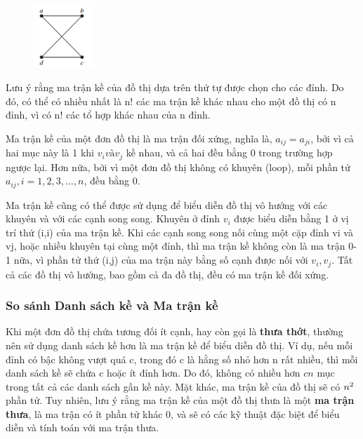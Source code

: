 \begin{figure}[H] %
    \centering %
    \includegraphics[width=0.2\textwidth]{assets/pic3.png} 
    \label{fig:gr_01}
\end{figure}


Lưu ý rằng ma trận kề của đồ thị dựa trên thứ tự được chọn cho các đỉnh. Do đó, có thể có nhiều nhất là n! các ma trận kề khác nhau cho một đồ thị có n đỉnh, vì có n! các tổ hợp khác nhau của n đỉnh.

Ma trận kề của một đơn đồ thị là ma trận đối xứng, nghĩa là, $a_{ij} = a_{ji}$, bởi vì cả hai mục này là 1 khi $v_i và v_j$ kề nhau, và cả hai đều bằng 0 trong trường hợp ngược lại. Hơn nữa, bởi vì một đơn đồ thị không có khuyên (loop), mỗi phần tử $a_{ij}, i = 1, 2, 3,…, n$, đều bằng 0.

Ma trận kề cũng có thể được sử dụng để biểu diễn đồ thị vô hướng với các khuyên và với các cạnh song song. Khuyên ở đỉnh $v_i$ được biểu diễn bằng 1 ở vị trí thứ (i,i) của ma trận kề. Khi các cạnh song song nối cùng một cặp đỉnh vi và vj, hoặc nhiều khuyên tại cùng một đỉnh, thì ma trận kề không còn là ma trận 0-1 nữa, vì phần tử thứ (i,j) của ma trận này bằng số cạnh được nối với ${v_i, v_j}$. Tất cả các đồ thị vô hướng, bao gồm cả đa đồ thị, đều có ma trận kề đối xứng.

\subsubsection{So sánh Danh sách kề và Ma trận kề}
Khi một đơn đồ thị chứa tương đối ít cạnh, hay còn gọi là \textbf{thưa thớt}, thường nên sử dụng danh sách kề hơn là ma trận kề để biểu diễn đồ thị. Ví dụ, nếu mỗi đỉnh có bậc không vượt quá c, trong đó c là hằng số nhỏ hơn n rất nhiều, thì mỗi danh sách kề sẽ chứa c hoặc ít đỉnh hơn. Do đó, không có nhiều hơn $cn$ mục trong tất cả các danh sách gần kề này. Mặt khác, ma trận kề của đồ thị sẽ có $n\sp{2}$ phần tử. Tuy nhiên, lưu ý rằng ma trận kề của một đồ thị thưa là một \textbf{ma trận thưa}, là ma trận có ít phần tử khác 0, và sẽ có các kỹ thuật đặc biệt để biểu diễn và tính toán với ma trận thưa.

